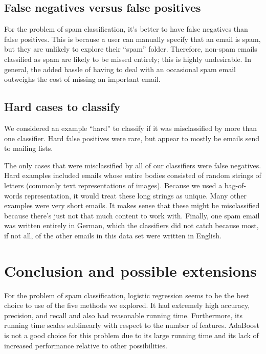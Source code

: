 \documentclass{article} %
\begin{document}
\subsection{False negatives versus false positives}
For the problem of spam classification, it's better to have false negatives than false positives. This is because a user can manually specify that an email is spam, but they are unlikely to explore their ``spam'' folder. Therefore, non-spam emails classified as spam are likely to be missed entirely; this is highly undesirable. In general, the added hassle of having to deal with an occasional spam email outweighs the cost of missing an important email. 

\subsection{Hard cases to classify}
We considered an example ``hard'' to classify if it was misclassified by more than one classifier. Hard false positives were rare, but appear to mostly be emails send to mailing lists.

The only cases that were misclassified by all of our classifiers were false negatives. Hard examples included emails whose entire bodies consisted of random strings of letters (commonly text representations of images). Because we used a bag-of-words representation, it would treat these long strings as unique. Many other examples were very short emails. It makes sense that these might be misclassified because there's just not that much content to work with. Finally, one spam email was written entirely in German, which the classifiers did not catch because most, if not all, of the other emails in this data set were written in English. 

\section{Conclusion and possible extensions}

For the problem of spam classification, logistic regression seems to be the best choice to use of the five methods we explored. It had extremely high accuracy, precision, and recall and also had reasonable running time. Furthermore, its running time scales sublinearly with respect to the number of features. AdaBoost is not a good choice for this problem due to its large running time and its lack of increased performance relative to other possibilities. 
\end{document}
